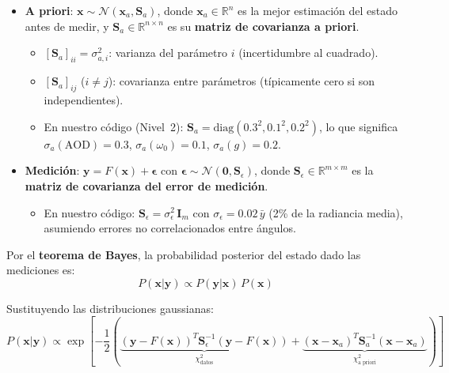 \documentclass[a4paper,11pt]{article}
\begin{document}
\begin{itemize}
    \item \textbf{A priori}: $\mathbf{x} \sim \mathcal{N}(\mathbf{x}_a, \mathbf{S}_a)$,
          donde $\mathbf{x}_a \in \mathbb{R}^n$ es la mejor estimaci\'on del
          estado antes de medir, y $\mathbf{S}_a \in \mathbb{R}^{n\times n}$
          es su \textbf{matriz de covarianza a priori}.
          \begin{itemize}
              \item $[\mathbf{S}_a]_{ii} = \sigma_{a,i}^2$: varianza del
                    par\'ametro $i$ (incertidumbre al cuadrado).
              \item $[\mathbf{S}_a]_{ij}$ ($i\neq j$): covarianza entre
                    par\'ametros (t\'ipicamente cero si son independientes).
              \item En nuestro c\'odigo (Nivel~2):
                    $\mathbf{S}_a = \text{diag}(0.3^2, 0.1^2, 0.2^2)$,
                    lo que significa $\sigma_a(\text{AOD}) = 0.3$,
                    $\sigma_a(\omega_0) = 0.1$, $\sigma_a(g) = 0.2$.
          \end{itemize}
    \item \textbf{Medici\'on}: $\mathbf{y} = F(\mathbf{x}) + \bm{\epsilon}$
          con $\bm{\epsilon} \sim \mathcal{N}(\mathbf{0}, \mathbf{S}_\epsilon)$,
          donde $\mathbf{S}_\epsilon \in \mathbb{R}^{m\times m}$ es la
          \textbf{matriz de covarianza del error de medici\'on}.
          \begin{itemize}
              \item En nuestro c\'odigo:
                    $\mathbf{S}_\epsilon = \sigma_\epsilon^2\,\mathbf{I}_m$
                    con $\sigma_\epsilon = 0.02\,\bar{y}$ (2\% de la
                    radiancia media), asumiendo errores no correlacionados
                    entre \'angulos.
          \end{itemize}
\end{itemize}

Por el \textbf{teorema de Bayes}, la probabilidad posterior del estado dado
las mediciones es:
\begin{equation}
    P(\mathbf{x}|\mathbf{y}) \propto P(\mathbf{y}|\mathbf{x})\,P(\mathbf{x})
\end{equation}

Sustituyendo las distribuciones gaussianas:
\begin{equation}
    P(\mathbf{x}|\mathbf{y}) \propto
    \exp\!\left[-\frac{1}{2}\left(
    \underbrace{(\mathbf{y}-F(\mathbf{x}))^T\mathbf{S}_\epsilon^{-1}(\mathbf{y}-F(\mathbf{x}))}_{\chi^2_{\text{datos}}}
    + \underbrace{(\mathbf{x}-\mathbf{x}_a)^T\mathbf{S}_a^{-1}(\mathbf{x}-\mathbf{x}_a)}_{\chi^2_{\text{a priori}}}
    \right)\right]
\end{equation}
\end{document}
